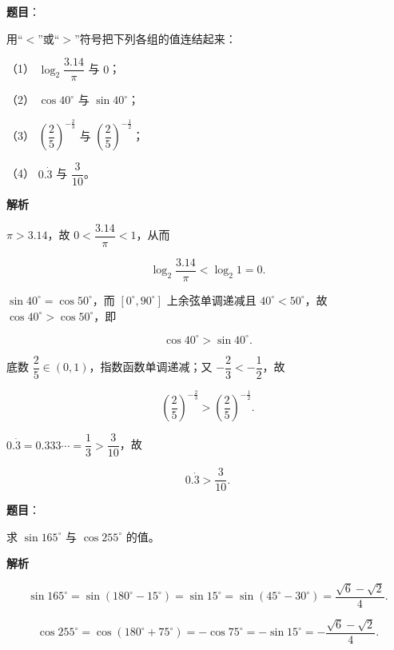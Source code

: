 \begin{answer}

\textbf{题目}：

用“$<$”或“$>$”符号把下列各组的值连结起来：

（1） $\log_{2}\dfrac{3.14}{\pi}$ 与 $0$；

（2） $\cos40^{\circ}$ 与 $\sin40^{\circ}$；

（3） $\left(\dfrac{2}{5}\right)^{-\frac{2}{3}}$ 与 $\left(\dfrac{2}{5}\right)^{-\frac{1}{2}}$；

（4） $0.\dot{3}$ 与 $\dfrac{3}{10}$。

\textbf{解析}


$\pi>3.14$，故 $0<\dfrac{3.14}{\pi}<1$，从而

\nopagebreak[4]
\[
\log_{2}\dfrac{3.14}{\pi}<\log_{2}1=0.
\]


$\sin40^{\circ}=\cos50^{\circ}$，而 $[0^{\circ},90^{\circ}]$ 上余弦单调递减且 $40^{\circ}<50^{\circ}$，故 $\cos40^{\circ}>\cos50^{\circ}$，即

\nopagebreak[4]
\[
\cos40^{\circ}>\sin40^{\circ}.
\]


底数 $\dfrac{2}{5}\in(0,1)$，指数函数单调递减；又 $-\dfrac{2}{3}<-\dfrac{1}{2}$，故

\nopagebreak[4]
\[
\left(\dfrac{2}{5}\right)^{-\frac{2}{3}}>\left(\dfrac{2}{5}\right)^{-\frac{1}{2}}.
\]


$0.\dot{3}=0.333\cdots=\dfrac{1}{3}>\dfrac{3}{10}$，故

\nopagebreak[4]
\[
0.\dot{3}>\dfrac{3}{10}.
\]





\end{answer}
\begin{answer}

\textbf{题目}：

求 $\sin165^{\circ}$ 与 $\cos255^{\circ}$ 的值。

\textbf{解析}

\nopagebreak[4]
\[
\sin165^{\circ}=\sin(180^{\circ}-15^{\circ})=\sin15^{\circ}
=\sin(45^{\circ}-30^{\circ})
=\dfrac{\sqrt{6}-\sqrt{2}}{4}.
\]

\nopagebreak[4]
\[
\cos255^{\circ}=\cos(180^{\circ}+75^{\circ})=-\cos75^{\circ}
=-\sin15^{\circ}
=-\dfrac{\sqrt{6}-\sqrt{2}}{4}.
\]


\end{answer}
